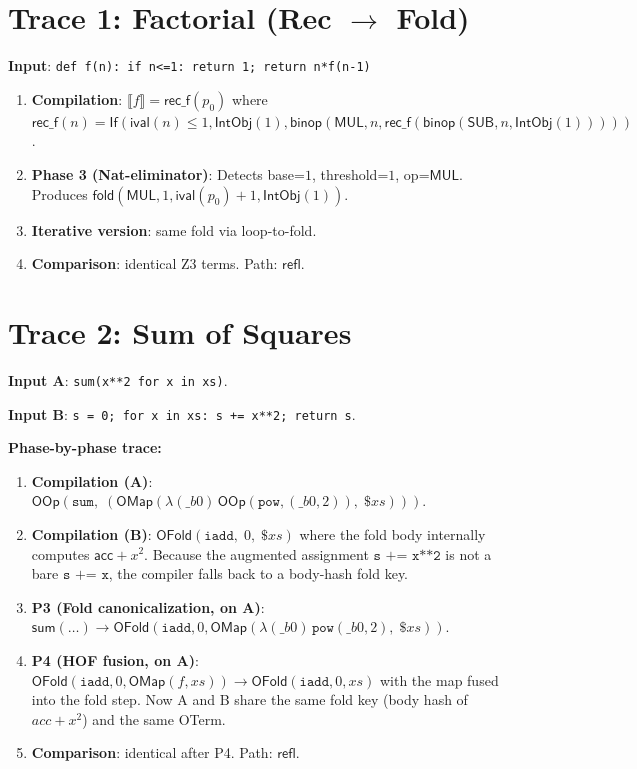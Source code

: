 \documentclass[11pt,a4paper]{report}
\theoremstyle{definition}
\theoremstyle{plain}
\newcommand{\den}[1]{\llbracket #1 \rrbracket}
\newcommand{\fold}{\mathsf{fold}}
\begin{document}
\section{Trace 1: Factorial (Rec $\to$ Fold)}

\textbf{Input}: \texttt{def f(n): if n<=1: return 1; return n*f(n-1)}

\begin{enumerate}
  \item \textbf{Compilation}: $\den{f} = \mathsf{rec\_f}(p_0)$ where
    $\mathsf{rec\_f}(n) = \mathsf{If}(\mathsf{ival}(n) \leq 1,
    \mathsf{IntObj}(1), \mathsf{binop}(\mathsf{MUL}, n,
    \mathsf{rec\_f}(\mathsf{binop}(\mathsf{SUB}, n, \mathsf{IntObj}(1)))))$.
  \item \textbf{Phase 3 (Nat-eliminator)}: Detects base=$1$,
    threshold=$1$, op=$\mathsf{MUL}$.  Produces
    $\fold(\mathsf{MUL}, 1, \mathsf{ival}(p_0)+1, \mathsf{IntObj}(1))$.
  \item \textbf{Iterative version}: same fold via loop-to-fold.
  \item \textbf{Comparison}: identical Z3 terms.  Path: $\mathsf{refl}$.
\end{enumerate}

\section{Trace 2: Sum of Squares}

\textbf{Input A}: \texttt{sum(x**2 for x in xs)}.

\textbf{Input B}: \texttt{s = 0; for x in xs: s += x**2; return s}.

\medskip\noindent
\textbf{Phase-by-phase trace:}
\begin{enumerate}
  \item \textbf{Compilation (A)}:
    $\mathsf{OOp}(\texttt{sum},\; (\mathsf{OMap}(\lambda(\_b0)\,
    \mathsf{OOp}(\texttt{pow}, (\_b0, 2)),\; \$\mathit{xs})))$.

  \item \textbf{Compilation (B)}:
    $\mathsf{OFold}(\texttt{iadd},\; 0,\; \$\mathit{xs})$ where
    the fold body internally computes $\mathsf{acc} + x^2$.
    Because the augmented assignment $\texttt{s += x**2}$ is not a
    bare $\texttt{s += x}$, the compiler falls back to a body-hash
    fold key.

  \item \textbf{P3 (Fold canonicalization, on A)}:
    $\mathsf{sum}(\ldots) \to \mathsf{OFold}(\texttt{iadd}, 0,
    \mathsf{OMap}(\lambda(\_b0)\, \texttt{pow}(\_b0, 2),\; \$\mathit{xs}))$.

  \item \textbf{P4 (HOF fusion, on A)}:
    $\mathsf{OFold}(\texttt{iadd}, 0, \mathsf{OMap}(f, xs))
    \to \mathsf{OFold}(\texttt{iadd}, 0, xs)$ with the map fused into
    the fold step.  Now A and B share the same fold key (body hash of
    $\mathit{acc} + x^2$) and the same OTerm.

  \item \textbf{Comparison}: identical after P4.  Path: $\mathsf{refl}$.
\end{enumerate}
\end{document}
